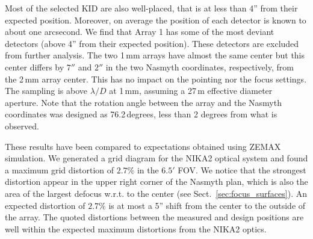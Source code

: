 Most of the selected KID are also well-placed, that is at less than 4'' from
their expected position. Moreover, on average the position of each
detector is known to about one arcsecond. We find
that Array 1 has some of the most deviant detectors (above 4''
from their expected position). These detectors are excluded from
further analysis. The two 1\,mm arrays have almost
the same center but this center differs by $7''$ and $2''$ in the two Nasmyth
coordinates, respectively, from the 2\,mm array center. This has no impact on the
pointing nor the focus settings. The sampling is above $\lambda/D$ at
1\,mm, assuming a 27\,m effective diameter aperture. Note that
the rotation angle between the array and the Nasmyth
coordinates was designed as 76.2\,degrees, less than 2 degrees from
what is observed.


These results have been compared to expectations obtained using ZEMAX
simulation. 
%
%
%
%
We generated a grid diagram for the NIKA2 optical system and found a maximum
grid distortion of $2.7\%$ in the $6.5'$ FOV. We notice that the
strongest distortion appear in the upper right corner of the Nasmyth plan, which is
also the area of the largest defocus w.r.t. to the center (see
Sect.~\ref{sec:focus_surfaces}).
An expected distortion of $2.7\%$ is at most a 5'' shift from the
center to the outside of the array. The quoted distortions between the
measured and design positions are well within the expected
maximum distortions from the NIKA2 optics.

